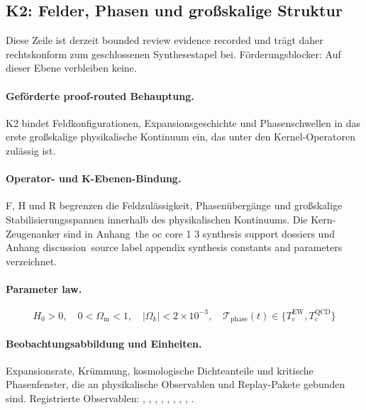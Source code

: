 \subsection{K2: Felder, Phasen und großskalige Struktur}
\label{sec:oc-core-1-3-synthesis-k2}
Diese Zeile ist derzeit bounded review evidence recorded und trägt daher rechtskonform zum geschlossenen Synthesestapel bei.
Förderungsblocker: Auf dieser Ebene verbleiben keine.

\paragraph{Geförderte proof-routed Behauptung.}
K2 bindet Feldkonfigurationen, Expansionsgeschichte und Phasenschwellen in das erste großskalige physikalische Kontinuum ein, das unter den Kernel-Operatoren zulässig ist.

\paragraph{Operator- und K-Ebenen-Bindung.}
F, H und R begrenzen die Feldzulässigkeit, Phasenübergänge und großskalige Stabilisierungsspannen innerhalb des physikalischen Kontinuums.
Die Kern-Zeugenanker sind in Anhang~the oc core 1 3 synthesis support dossiers und Anhang discussion~source label appendix synthesis constants and parameters verzeichnet.

\paragraph{Parameter law.}
\[
H_0 > 0,\quad 0 < \Omega_{\mathrm{m}} < 1,\quad |\Omega_k| < 2 \times 10^{-3},\quad \mathcal{T}_{\mathrm{phase}}(t) \in \{T_c^{\mathrm{EW}}, T_c^{\mathrm{QCD}}\}
\]

\paragraph{Beobachtungsabbildung und Einheiten.}
Expansionsrate, Krümmung, kosmologische Dichteanteile und kritische Phasenfenster, die an physikalische Observablen und Replay-Pakete gebunden sind.
Registrierte Observablen: , \allowbreak {}, \allowbreak {}, \allowbreak {}, \allowbreak {}, \allowbreak {}, \allowbreak {}, \allowbreak {}, \allowbreak {}.

